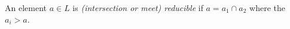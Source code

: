 An element $a \in L$ is \textit{(intersection or meet) reducible} if $a = a_1 \cap a_2$ where the $a_i > a$.
